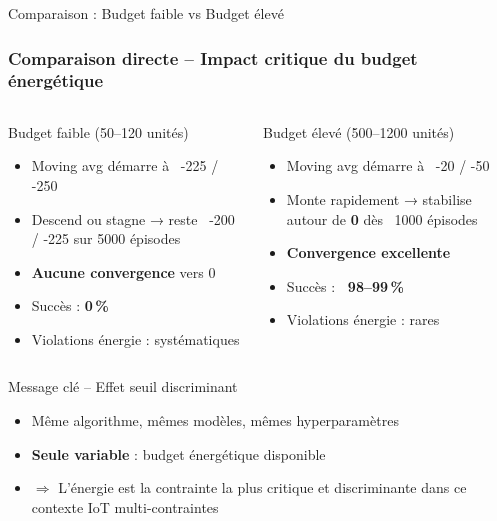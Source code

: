 \documentclass[aspectratio=169]{beamer}
\begin{document}
\begin{frame}{Comparaison : Budget faible vs Budget élevé}
\frametitle{Comparaison directe – Impact critique du budget énergétique}

\begin{columns}[T]
    \begin{alertblock}{Budget faible (50–120 unités)}
    \small
    \begin{itemize}
        \item Moving avg démarre à ~-225 / -250
        \item Descend ou stagne → reste ~-200 / -225 sur 5000 épisodes
        \item \textbf{Aucune convergence} vers 0
        \item Succès : \textbf{0\,\%}
        \item Violations énergie : systématiques
    \end{itemize}
    \end{alertblock}

    \begin{exampleblock}{Budget élevé (500–1200 unités)}
    \small
    \begin{itemize}
        \item Moving avg démarre à ~-20 / -50
        \item Monte rapidement → stabilise autour de \textbf{0} dès ~1000 épisodes
        \item \textbf{Convergence excellente}
        \item Succès : \textbf{~98–99\,\%}
        \item Violations énergie : rares
    \end{itemize}
    \end{exampleblock}
\end{columns}

\begin{alertblock}{Message clé – Effet seuil discriminant}
\begin{itemize}
    \item Même algorithme, mêmes modèles, mêmes hyperparamètres
    \item \textbf{Seule variable} : budget énergétique disponible
    \item $\Rightarrow$ \alert{L’énergie est la contrainte la plus critique et discriminante dans ce contexte IoT multi-contraintes}
\end{itemize}
\end{alertblock}
\end{frame}
\end{document}
